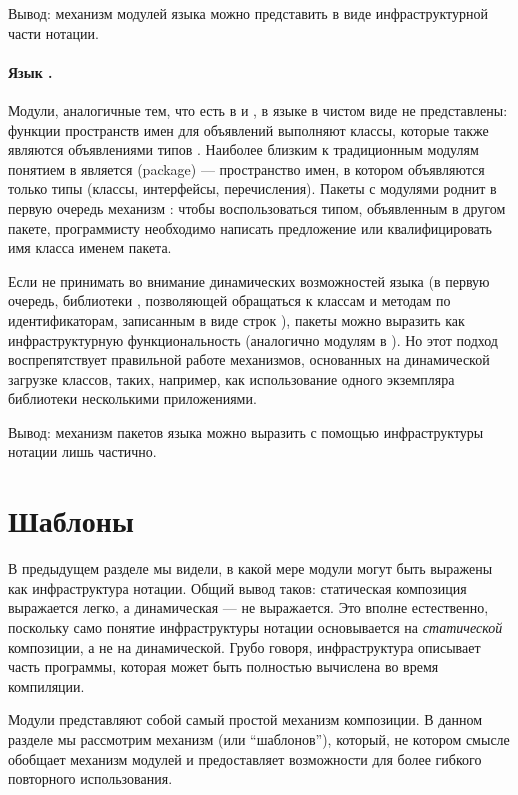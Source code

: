 {Вывод: механизм модулей языка  можно представить в виде инфраструктурной части нотации.

\paragraph*{Язык .} Модули, аналогичные тем, что есть в  и , в языке  в чистом виде не представлены: функции пространств имен для объявлений выполняют классы, которые также являются объявлениями типов \cite{JLS}. Наиболее близким к традиционным модулям понятием в  является  (package) --- пространство имен, в котором объявляются только типы (классы, интерфейсы, перечисления). Пакеты с модулями роднит в первую очередь механизм : чтобы воспользоваться типом, объявленным в другом пакете, программисту необходимо написать предложение  или квалифицировать имя класса именем пакета.

Если не принимать во внимание динамических возможностей языка  (в первую очередь, библиотеки , позволяющей обращаться к классам и методам по идентификаторам, записанным в виде строк \cite{JLS}), пакеты можно выразить как инфраструктурную функциональность (аналогично модулям в ). Но этот подход воспрепятствует правильной работе механизмов, основанных на динамической загрузке классов, таких, например, как использование одного экземпляра библиотеки несколькими приложениями.

Вывод: механизм пакетов языка  можно выразить с помощью инфраструктуры нотации лишь частично.

\section{Шаблоны}

В предыдущем разделе мы видели, в какой мере модули могут быть выражены как инфраструктура нотации. Общий вывод таков: статическая композиция выражается легко, а динамическая --- не выражается. Это вполне естественно, поскольку само понятие инфраструктуры нотации основывается на \emph{статической} композиции, а не на динамической. Грубо говоря, инфраструктура описывает часть программы, которая может быть полностью вычислена во время компиляции.

Модули представляют собой самый простой механизм композиции. В данном разделе мы рассмотрим механизм  (или ``шаблонов''), который, не котором смысле обобщает механизм модулей и предоставляет возможности для более гибкого повторного использования.

}
